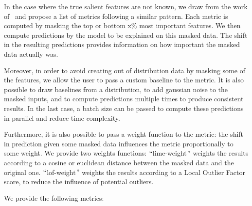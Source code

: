 In the case where the true salient features are not known, we draw from the work
of~\citep{shrikumar2017learning,deyoung2019eraser,crabbe2021explaining} and propose a list of metrics following a
similar pattern.
Each metric is computed by masking the top or bottom x\% most important features.
We then compute predictions by the model to be explained on this masked data.
The shift in the resulting predictions provides information on how important the masked data actually was.

Moreover, in order to avoid creating out of distribution data by masking some of the features, we allow the user to
pass a custom baseline to the metric.
It is also possible to draw baselines from a distribution, to add gaussian noise to the masked inputs, and to compute
predictions multiple times to produce consistent results.
In the last case, a batch size can be passed to compute these predictions in parallel and reduce time complexity.

Furthermore, it is also possible to pass a weight function to the metric: the shift in prediction given some masked
data influences the metric proportionally to some weight.
We provide two weights functions: $``$lime-weight$"$ weights the results according to a cosine or euclidean distance
between the masked data and the original one.
$``$lof-weight$"$ weights the results according to a Local Outlier Factor score, to reduce the influence of potential
outliers.

\newpage

We provide the following metrics:

